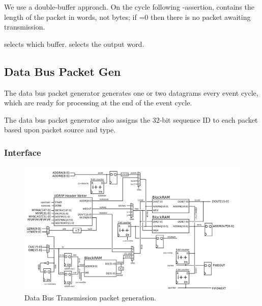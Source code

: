 We use a double-buffer approach. On the cycle following
-assertion,  contains the length of
the packet in words, not bytes; if  =0 then there is
no packet awaiting transmission.

 selects which buffer.  selects the
output word.

\subsection{Data Bus Packet Gen}
The data bus packet generator generates one or two datagrams every
event cycle, which are ready for processing at the end of the event
cycle.

The data bus packet generator also assigns the 32-bit sequence ID to
each packet based upon packet source and type.

\subsubsection{Interface}
\begin{figure}
\begin{centering}
\includegraphics[scale=0.8]{data.packetgen.svg}
\end{centering}
\caption{Data Bus Transmission packet generation.}
\label{data.packetgen}
\end{figure}

